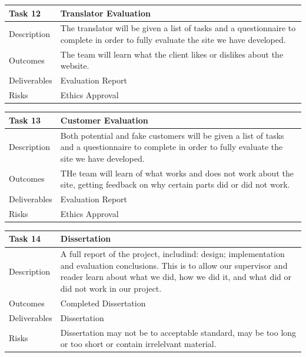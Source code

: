 \documentclass{l3proj}
\begin{document}
\begin{center}
    \begin{tabular}{ | l | p{12cm} |}
    \hline	
    Task 12 & Translator Evaluation \\ \hline
    Description & The translator will be given a list of tasks and a questionnaire to complete in order to fully evaluate the site we have developed. \\ \hline   
    Outcomes & The team will learn what the client likes or dislikes about the website. \\ \hline
    Deliverables & Evaluation Report \\ \hline
    Risks & Ethics Approval \\ 
    \hline
    \end{tabular}
\end{center}

\begin{center}
    \begin{tabular}{ | l | p{12cm} |}
    \hline	
    Task 13 & Customer Evaluation \\ \hline
    Description & Both potential and fake customers will be given a list of tasks and a questionnaire to complete in order to fully evaluate the site we have developed. \\ \hline   
    Outcomes & THe team will learn of what works and does not work about the site, getting feedback on why certain parts did or did not work. \\ \hline
    Deliverables & Evaluation Report \\ \hline
    Risks & Ethics Approval \\ 
    \hline
    \end{tabular}
\end{center}

\begin{center}
    \begin{tabular}{ | l | p{12cm} |}
    \hline	
    Task 14 & Dissertation \\ \hline
    Description & A full report of the project, includind: design; implementation and evaluation conclusions. This is to allow our supervisor and reader learn about what we did, how we did it, and what did or did not work in our project. \\ \hline   
    Outcomes & Completed Dissertation \\ \hline
    Deliverables & Dissertation \\ \hline
    Risks & Dissertation may not be to acceptable standard, may be too long or too short or contain irrelelvant material. \\ 
    \hline
    \end{tabular}
\end{center}
\end{document}
